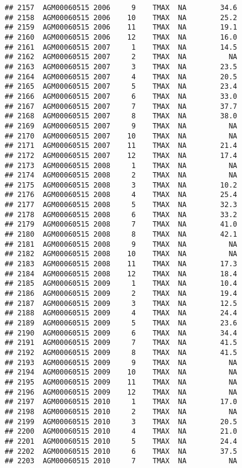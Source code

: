 \documentclass{article}\usepackage[]{graphicx}\usepackage[]{color}
\makeatletter
\newenvironment{kframe}{%
 \def\at@end@of@kframe{}%
 \ifinner\ifhmode%
  \def\at@end@of@kframe{\end{minipage}}%
  \begin{minipage}{\columnwidth}%
 \fi\fi%
 \def\FrameCommand##1{\hskip\@totalleftmargin \hskip-\fboxsep
 \colorbox{shadecolor}{##1}\hskip-\fboxsep
     \hskip-\linewidth \hskip-\@totalleftmargin \hskip\columnwidth}%
 \MakeFramed {\advance\hsize-\width
   \@totalleftmargin\z@ \linewidth\hsize
   \@setminipage}}%
 {\par\unskip\endMakeFramed%
 \at@end@of@kframe}
\newenvironment{knitrout}{}{} %
\makeatother
\begin{document}
\begin{knitrout}
\begin{kframe}
\begin{verbatim}
## 2157  AGM00060515 2006     9    TMAX  NA        34.6
## 2158  AGM00060515 2006    10    TMAX  NA        25.2
## 2159  AGM00060515 2006    11    TMAX  NA        19.1
## 2160  AGM00060515 2006    12    TMAX  NA        16.0
## 2161  AGM00060515 2007     1    TMAX  NA        14.5
## 2162  AGM00060515 2007     2    TMAX  NA          NA
## 2163  AGM00060515 2007     3    TMAX  NA        23.5
## 2164  AGM00060515 2007     4    TMAX  NA        20.5
## 2165  AGM00060515 2007     5    TMAX  NA        23.4
## 2166  AGM00060515 2007     6    TMAX  NA        33.0
## 2167  AGM00060515 2007     7    TMAX  NA        37.7
## 2168  AGM00060515 2007     8    TMAX  NA        38.0
## 2169  AGM00060515 2007     9    TMAX  NA          NA
## 2170  AGM00060515 2007    10    TMAX  NA          NA
## 2171  AGM00060515 2007    11    TMAX  NA        21.4
## 2172  AGM00060515 2007    12    TMAX  NA        17.4
## 2173  AGM00060515 2008     1    TMAX  NA          NA
## 2174  AGM00060515 2008     2    TMAX  NA          NA
## 2175  AGM00060515 2008     3    TMAX  NA        10.2
## 2176  AGM00060515 2008     4    TMAX  NA        25.4
## 2177  AGM00060515 2008     5    TMAX  NA        32.3
## 2178  AGM00060515 2008     6    TMAX  NA        33.2
## 2179  AGM00060515 2008     7    TMAX  NA        41.0
## 2180  AGM00060515 2008     8    TMAX  NA        42.1
## 2181  AGM00060515 2008     9    TMAX  NA          NA
## 2182  AGM00060515 2008    10    TMAX  NA          NA
## 2183  AGM00060515 2008    11    TMAX  NA        17.3
## 2184  AGM00060515 2008    12    TMAX  NA        18.4
## 2185  AGM00060515 2009     1    TMAX  NA        10.4
## 2186  AGM00060515 2009     2    TMAX  NA        19.4
## 2187  AGM00060515 2009     3    TMAX  NA        12.5
## 2188  AGM00060515 2009     4    TMAX  NA        24.4
## 2189  AGM00060515 2009     5    TMAX  NA        23.6
## 2190  AGM00060515 2009     6    TMAX  NA        34.4
## 2191  AGM00060515 2009     7    TMAX  NA        41.5
## 2192  AGM00060515 2009     8    TMAX  NA        41.5
## 2193  AGM00060515 2009     9    TMAX  NA          NA
## 2194  AGM00060515 2009    10    TMAX  NA          NA
## 2195  AGM00060515 2009    11    TMAX  NA          NA
## 2196  AGM00060515 2009    12    TMAX  NA          NA
## 2197  AGM00060515 2010     1    TMAX  NA        17.0
## 2198  AGM00060515 2010     2    TMAX  NA          NA
## 2199  AGM00060515 2010     3    TMAX  NA        20.5
## 2200  AGM00060515 2010     4    TMAX  NA        21.0
## 2201  AGM00060515 2010     5    TMAX  NA        24.4
## 2202  AGM00060515 2010     6    TMAX  NA        37.5
## 2203  AGM00060515 2010     7    TMAX  NA          NA

\end{verbatim}
\end{kframe}
\end{knitrout}
\end{document}
